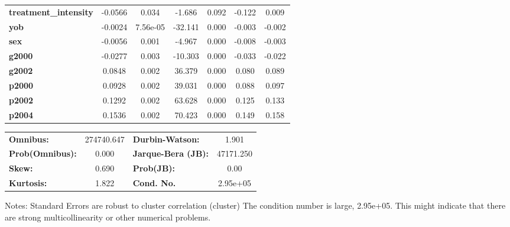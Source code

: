\begin{center}
\begin{tabular}{lcccccc}
\textbf{treatment\_intensity}   &      -0.0566  &        0.034     &    -1.686  &         0.092        &       -0.122    &        0.009     \\
\textbf{yob}                    &      -0.0024  &     7.56e-05     &   -32.141  &         0.000        &       -0.003    &       -0.002     \\
\textbf{sex}                    &      -0.0056  &        0.001     &    -4.967  &         0.000        &       -0.008    &       -0.003     \\
\textbf{g2000}                  &      -0.0277  &        0.003     &   -10.303  &         0.000        &       -0.033    &       -0.022     \\
\textbf{g2002}                  &       0.0848  &        0.002     &    36.379  &         0.000        &        0.080    &        0.089     \\
\textbf{p2000}                  &       0.0928  &        0.002     &    39.031  &         0.000        &        0.088    &        0.097     \\
\textbf{p2002}                  &       0.1292  &        0.002     &    63.628  &         0.000        &        0.125    &        0.133     \\
\textbf{p2004}                  &       0.1536  &        0.002     &    70.423  &         0.000        &        0.149    &        0.158     \\
\bottomrule
\end{tabular}
\begin{tabular}{lclc}
\textbf{Omnibus:}       & 274740.647 & \textbf{  Durbin-Watson:     } &     1.901  \\
\textbf{Prob(Omnibus):} &    0.000   & \textbf{  Jarque-Bera (JB):  } & 47171.250  \\
\textbf{Skew:}          &    0.690   & \textbf{  Prob(JB):          } &      0.00  \\
\textbf{Kurtosis:}      &    1.822   & \textbf{  Cond. No.          } &  2.95e+05  \\
\bottomrule
\end{tabular}
\end{center}

Notes: \newline
 [1] Standard Errors are robust to cluster correlation (cluster) \newline
 [2] The condition number is large, 2.95e+05. This might indicate that there are \newline
 strong multicollinearity or other numerical problems.